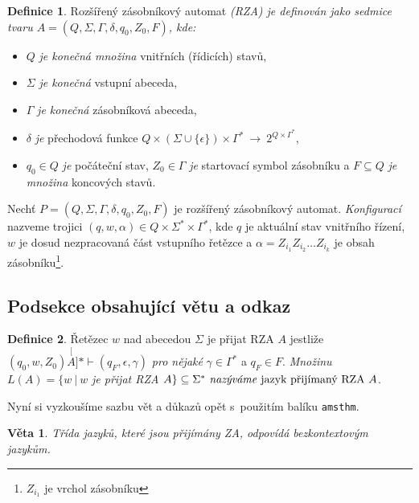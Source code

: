 \documentclass[a4paper, 11pt, twocolumn, final]{article}
\theoremstyle{definition}
\newtheorem{definition}{Definice}
\theoremstyle{plain}
\newtheorem{theorem}{Věta}
\begin{document}
\begin{definition}
    \label{def:expanded-stack-automat}
    Rozšířený zásobníkový automat \emph{(RZA) je definován jako sedmice tvaru
    $A = (Q, \Sigma, \Gamma, \delta, q_0, Z_0, F)$, kde:}

    \begin{itemize}[label=$\bullet$]
        \item $Q$ \emph{je konečná množina} vnitřních (řídicích) stavů,
        \item $\Sigma$ \emph{je konečná} vstupní abeceda,
        \item $\Gamma$ \emph{je konečná} zásobníková abeceda,
        \item $\delta$ \emph{je} přechodová funkce $Q \times (\Sigma \cup
        \{\epsilon\}) \times \Gamma^\ast\ {\rightarrow}\ 2^{Q \times
        \Gamma^\ast}$,
        \item $q_0 \in Q$ \emph{je} počáteční stav, $Z_0 \in \Gamma$ \emph{je}
        startovací symbol zásobníku a $F \subseteq Q$ \emph{je množina}
        koncových stavů.
    \end{itemize}
    
    Nechť $P = (Q, \Sigma, \Gamma, \delta, q_0, Z_0, F)$ je rozšířený
    zásobníkový automat. \emph{Konfigurací} nazveme trojici $(q, w, \alpha)
    \in Q \times \Sigma^\ast \times \Gamma^\ast$, kde $q$ je aktuální stav
    vnitřního řízení, $w$ je dosud nezpracovaná část vstupního řetězce
    a $\alpha = Z_{i_1} Z_{i_2} \ldots Z_{i_k}$ je obsah zásobníku\footnote{
    $Z_{i_1}$ je vrchol zásobníku}.
\end{definition}

\subsection{Podsekce obsahující větu a odkaz}

\begin{definition}
    \label{def:string-w}
    Řetězec $w$ nad abecedou $\Sigma$ je přijat RZA $A$ jestliže $(q_0, w, Z_0)
    \stackrel[A]{\ast}{\vdash} (q_F, \epsilon, \gamma)$ \emph{pro nějaké}
    $\gamma \in \Gamma^\ast$ a $q_F \in F$. \emph{Množinu} $L(A) = \{w\ |\ w$
    \emph{je přijat RZA} $A\} \subseteq \mbox{$\Sigma^\ast$
    \emph{nazýváme} jazyk přijímaný RZA\ $A$}$.
\end{definition}

Nyní si vyzkoušíme sazbu vět a důkazů opět s~použitím balíku \texttt{amsthm}.

\begin{theorem}
    \label{th:lang-class}
    Třída jazyků, které jsou přijímány ZA, odpovídá {\normalfont bezkontextovým
    jazykům}.
\end{theorem}
\end{document}
